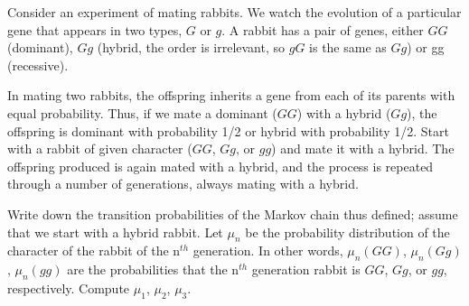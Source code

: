 \begin{question}
Consider an experiment of mating rabbits. We watch the evolution of a particular gene that appears in two types, $G$ or $g$. A rabbit has a pair of genes, either $GG$ (dominant), $Gg$ (hybrid, the order is irrelevant, so $gG$ is the same as $Gg$) or gg (recessive).

In mating two rabbits, the offspring inherits a gene from each of its parents with equal probability. Thus, if we mate a dominant ($GG$) with a hybrid ($Gg$), the offspring is dominant with probability 1/2 or hybrid with probability 1/2.
Start with a rabbit of given character ($GG$, $Gg$, or $gg$) and mate it with a hybrid. The offspring produced is again mated with a hybrid, and the process is repeated through a number of generations, always mating with a hybrid.
\begin{tasks}
\task Write down the transition probabilities of the Markov chain thus defined;
\task assume that we start with a hybrid rabbit. Let $\mu_n$ be the probability distribution of the character of the rabbit of the n$^{th}$ generation. In other words,
$\mu_n(GG)$, $\mu_n(Gg)$, $\mu_n(gg)$ are the probabilities that the n$^{th}$ generation rabbit is $GG$, $Gg$, or $gg$, respectively. Compute $\mu_1$, $\mu_2$, $\mu_3$.
\end{tasks}
\end{question}

